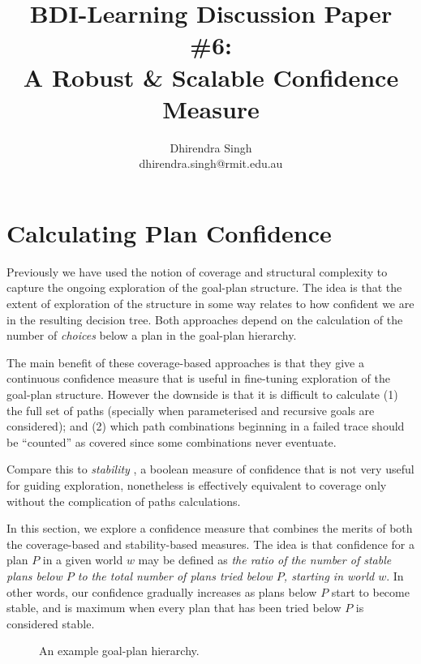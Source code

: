 \documentclass[a4paper]{article}
\title{BDI-Learning Discussion Paper \#6:\\A Robust \& Scalable Confidence Measure}
\author{
Dhirendra Singh\\dhirendra.singh@rmit.edu.au
}
\begin{document}

\maketitle


\section{Calculating Plan Confidence}

Previously we have used the notion of coverage \cite{Singh:AAMAS10} and structural complexity \cite{Singh:HYCAS10} to capture the ongoing exploration of the goal-plan structure. The idea is that the extent of exploration of the structure in some way relates to how confident we are in the resulting decision tree. Both approaches depend on the calculation of the number of \textit{choices} below a plan in the goal-plan hierarchy. 

The main benefit of these coverage-based approaches is that they give a continuous confidence measure that is useful in fine-tuning exploration of the goal-plan structure. However the downside is that it is difficult to calculate (1) the full set of paths (specially when parameterised and recursive goals are considered); and (2) which path combinations beginning in a failed trace should be ``counted'' as covered since some combinations never eventuate.

Compare this to \textit{stability} \cite{Airiau:IJAT09,Singh:AAMAS10}, a boolean measure of confidence that is not very useful for guiding exploration, nonetheless is effectively equivalent to coverage \cite{Singh:AAMAS10} only without the complication of paths calculations.

In this section, we explore a confidence measure that combines the merits of both the coverage-based and stability-based measures. The idea is that confidence for a plan $P$ in a given world $w$ may be defined as \textit{the ratio of the number of stable plans below $P$ to the total number of plans tried below $P$, starting in world $w$}. In other words, our confidence gradually increases as plans below $P$ start to become stable, and is maximum when every plan that has been tried below $P$ is considered stable.


\begin{figure}[ht]
\begin{center}
\resizebox{.75\textwidth}{!}{}
\end{center}
\caption{An example goal-plan hierarchy.}
\label{fig:conf}
\end{figure}
\end{document}
